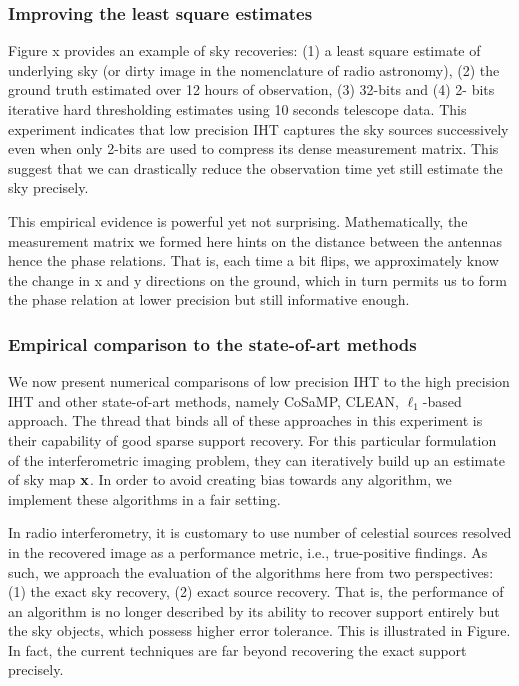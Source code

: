 \documentclass{article}
\begin{document}
\subsubsection{Improving the least square estimates}
Figure x provides an example of sky recoveries: (1) a least square estimate of underlying sky (or dirty image in the nomenclature of radio astronomy), (2) the ground truth estimated over 12 hours of observation, (3) 32-bits and (4) 2- bits iterative hard thresholding estimates using 10 seconds telescope data. This experiment indicates that low precision IHT captures the sky sources successively even when only 2-bits are used to compress its dense measurement matrix. This suggest that we can drastically reduce the observation time yet still estimate the sky precisely.



This empirical evidence is powerful yet not surprising. Mathematically, the measurement matrix we formed here hints on the distance between the antennas hence the phase relations. That is, each time a bit flips, we approximately know the change in x and y directions on the ground, which in turn permits us to form the phase relation at lower precision but still informative enough. 


\subsubsection{Empirical comparison to the state-of-art methods}

We now present numerical comparisons of low precision IHT to the high precision IHT and other state-of-art methods, namely CoSaMP, CLEAN, $\ell_1$-based approach. The thread that binds all of these approaches in this experiment is their capability of good sparse support recovery. For this particular formulation of the interferometric imaging problem, they can iteratively build up an estimate of sky map ${\bf x}$. In order to avoid creating bias towards any algorithm, we implement these algorithms in a fair setting.

In radio interferometry, it is customary to use number of celestial sources resolved in the recovered image as a performance metric, i.e., true-positive findings. As such, we approach the evaluation of the algorithms here from two perspectives: (1) the exact sky recovery, (2) exact source recovery. That is, the performance of an algorithm is no longer described by its ability to recover support entirely but the sky objects, which possess higher error tolerance. This is illustrated in Figure. In fact, the current techniques are far beyond recovering the exact support precisely.
\end{document}
